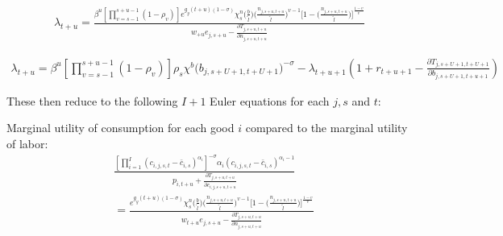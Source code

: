 \documentclass[letterpaper,12pt]{article}
\theoremstyle{definition}
\begin{document}
\begin{spacing}{1.5}
    \begin{equation}
      \begin{split}
      \lambda_{t+u} = \frac{ \beta^u\left[\prod_{v=s-1}^{s+u-1}(1-\rho_v)\right] e^{g_y (t+u)(1-\sigma)}\chi^n_{s}\biggl(\frac{b}{\tilde{l}}\biggr)\biggl(\frac{n_{j,s+u,t+u}}{\tilde{l}}\biggr)^{v-1}\Biggl[1 - \biggl(\frac{n_{j,s+u,t+u}}{\tilde{l}}\biggr)\Biggr]^{\frac{1-v}{v}} } { w_{+u} e_{j,s+u} - \frac{\partial T_{j,s+u,t+u}}{\partial n_{j,s+u,t+u}} }  \nonumber
      \end{split}
    \end{equation}

    \begin{equation}
      \begin{split}
      \lambda_{t+u} = \beta^u\left[\prod_{v=s-1}^{s+u-1}(1-\rho_v)\right] \rho_s\chi^b\bigl(b_{j,s+U+1,t+U+1}\bigr)^{-\sigma} - \lambda_{t+u+1} \left( 1 + r_{t+u+1} - \frac{\partial T_{j,s+U+1,t+U+1}}{\partial b_{j,s+U+1,t+u+1}} \right)
        \end{split}  \nonumber
    \end{equation}

    These then reduce to the following $I+1$ Euler equations for each $j,s$ and $t$:

    Marginal utility of consumption for each good $i$ compared to the marginal utility of labor:
    \begin{equation}\label{EqcEuler}
      \begin{split}
      & \frac{ \left[ \prod_{i=1}^I \left( c_{i,j,s,t} - \bar c_{i,s} \right) ^{\alpha_i} \right]^{-\sigma}\alpha_i \left( c_{i,j,s,t} - \bar c_{i,s} \right)^{\alpha_i-1} } { p_{i,t+u} + \frac{\partial T_{j,s+u,t+u}}{\partial c_{i,j,s+u,t+u}} } \\
      & = \frac{ e^{g_y (t+u)(1-\sigma)}\chi^n_{s}\biggl(\frac{b}{\tilde{l}}\biggr)\biggl(\frac{n_{j,s+u,t+u}}{\tilde{l}}\biggr)^{v-1}\Biggl[1 - \biggl(\frac{n_{j,s+u,t+u}}{\tilde{l}}\biggr)\Biggr]^{\frac{1-v}{v}} } { w_{t+u} e_{j,s+u} - \frac{\partial T_{j,s+u,t+u}}{\partial n_{j,s+u,t+u}} }
       \end{split}
    \end{equation}


\end{spacing}
\end{document}
